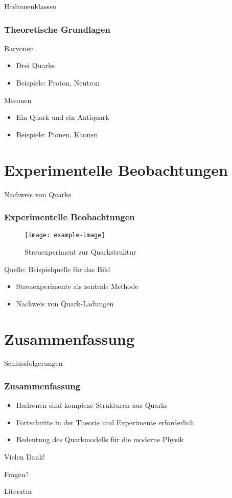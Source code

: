 \documentclass[aspectratio=169]{beamer} %
\begin{document}
	\begin{frame}{Hadronenklassen}
		\frametitle{Theoretische Grundlagen}
		\begin{block}{Baryonen}
			\begin{itemize}
				\item Drei Quarks
				\item Beispiele: Proton, Neutron
			\end{itemize}
		\end{block}
		\begin{block}{Mesonen}
			\begin{itemize}
				\item Ein Quark und ein Antiquark
				\item Beispiele: Pionen, Kaonen
			\end{itemize}
		\end{block}
	\end{frame}
	
	\section{Experimentelle Beobachtungen}
	\begin{frame}{Nachweis von Quarks}
		\frametitle{Experimentelle Beobachtungen}
		\begin{figure}
			\centering
			\texttt{[image: example-image]} %
			\caption{Streuexperiment zur Quarkstruktur}
		\end{figure}
		\vfill
		\tiny Quelle: Beispielquelle für das Bild
		\begin{itemize}
			\item Streuexperimente als zentrale Methode
			\item Nachweis von Quark-Ladungen
		\end{itemize}
	\end{frame}
	
	\section{Zusammenfassung}
	\begin{frame}{Schlussfolgerungen}
		\frametitle{Zusammenfassung}
		\begin{itemize}
			\item Hadronen sind komplexe Strukturen aus Quarks
			\item Fortschritte in der Theorie und Experimente erforderlich
			\item Bedeutung des Quarkmodells für die moderne Physik
		\end{itemize}
	\end{frame}
	
	\begin{frame}{Vielen Dank!}
		\begin{center}
			\Huge Fragen?
		\end{center}
	\end{frame}
	
	\begin{frame}[allowframebreaks]{Literatur}
		\printbibliography\end{frame}
	
\end{document}
